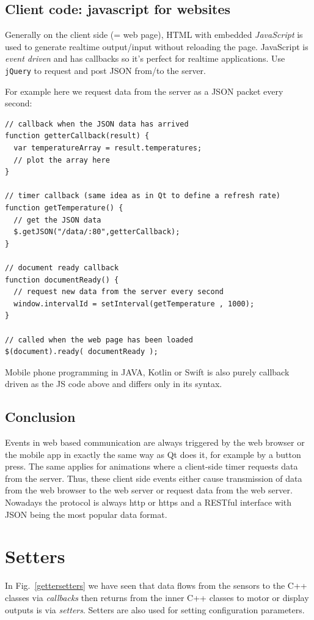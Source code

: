 \documentclass[12pt]{report}
\begin{document}
\section{Client code: javascript for websites}
Generally on the client side (= web page), HTML with embedded
\textsl{JavaScript} is used to generate realtime output/input without
reloading the page. JavaScript is \textsl{event driven} and has
callbacks so it's perfect for realtime applications. Use
\texttt{jQuery} to request and post JSON from/to the server.

For example here we request data from the server as a JSON
packet every second:

\begin{verbatim}
// callback when the JSON data has arrived
function getterCallback(result) {
  var temperatureArray = result.temperatures;
  // plot the array here
}

// timer callback (same idea as in Qt to define a refresh rate)
function getTemperature() {
  // get the JSON data
  $.getJSON("/data/:80",getterCallback);
}

// document ready callback
function documentReady() {
  // request new data from the server every second
  window.intervalId = setInterval(getTemperature , 1000);
}

// called when the web page has been loaded
$(document).ready( documentReady );
\end{verbatim}

Mobile phone programming in JAVA, Kotlin or Swift is also purely
callback driven as the JS code above and differs only in its syntax.

\section{Conclusion}
Events in web based communication are always triggered by the web
browser or the mobile app in exactly the same way as Qt does it, for
example by a button press. The same applies for animations where a
client-side timer requests data from the server. Thus, these client
side events either cause transmission of data from the web browser to
the web server or request data from the web server. Nowadays the protocol is
always http or https and a RESTful interface with JSON
being the most popular data format.


\chapter{Setters\label{setters}}
In Fig.~\ref{gettersetters} we have seen that data flows from
the sensors to the C++ classes via \textsl{callbacks} then returns
from the inner C++ classes to motor or display outputs is via
\textsl{setters}. Setters are also used for setting configuration
parameters.
\end{document}
